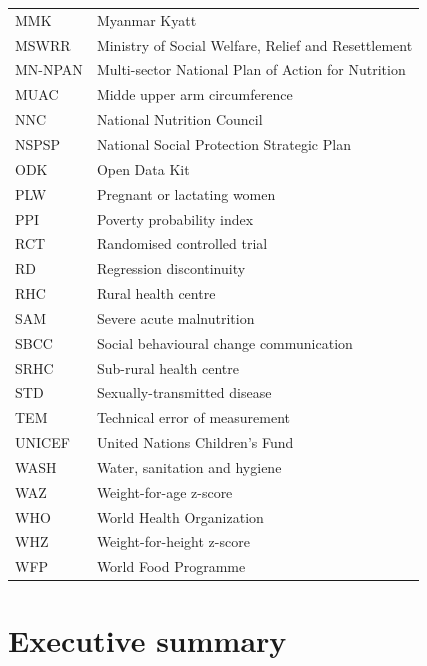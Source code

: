 \documentclass[12pt,a4paper]{article}
\begin{document}
\begin{table}[H]
\begin{tabular}{l>{\raggedright\arraybackslash}p{8cm}}
MMK & Myanmar Kyatt\\
\rowcolor{gray!6}  MSWRR & Ministry of Social Welfare, Relief and Resettlement\\
MN-NPAN & Multi-sector National Plan of Action for Nutrition\\
\addlinespace
\rowcolor{gray!6}  MUAC & Midde upper arm circumference\\
NNC & National Nutrition Council\\
\rowcolor{gray!6}  NSPSP & National Social Protection Strategic Plan\\
ODK & Open Data Kit\\
\rowcolor{gray!6}  PLW & Pregnant or lactating women\\
\addlinespace
PPI & Poverty probability index\\
\rowcolor{gray!6}  RCT & Randomised controlled trial\\
RD & Regression discontinuity\\
\rowcolor{gray!6}  RHC & Rural health centre\\
SAM & Severe acute malnutrition\\
\addlinespace
\rowcolor{gray!6}  SBCC & Social behavioural change communication\\
SRHC & Sub-rural health centre\\
\rowcolor{gray!6}  STD & Sexually-transmitted disease\\
TEM & Technical error of measurement\\
\rowcolor{gray!6}  UNICEF & United Nations Children's Fund\\
\addlinespace
WASH & Water, sanitation and hygiene\\
\rowcolor{gray!6}  WAZ & Weight-for-age z-score\\
WHO & World Health Organization\\
\rowcolor{gray!6}  WHZ & Weight-for-height z-score\\
WFP & World Food Programme\\
\bottomrule
\end{tabular}
\end{table}

\newpage

\hypertarget{executive-summary}{%
\section*{Executive summary}\label{executive-summary}}
\end{document}
